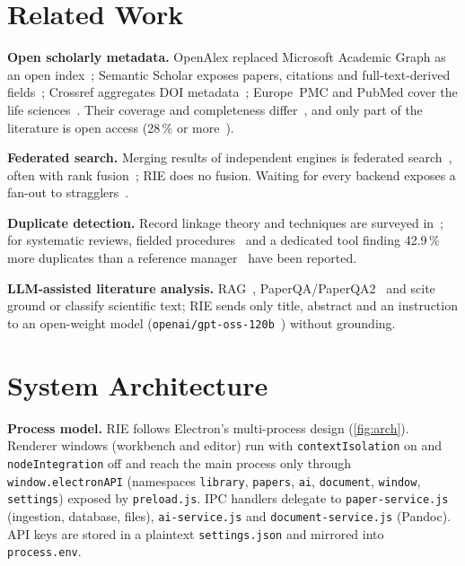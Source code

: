 \documentclass[conference]{IEEEtran}
\newcommand{\code}[1]{\texttt{\small #1}}
\newcommand{\RIE}{RIE}
\begin{document}
\section{Related Work}
\label{sec:related}

\textbf{Open scholarly metadata.} OpenAlex replaced Microsoft Academic Graph as an open index~\cite{priem2022openalex}; Semantic Scholar exposes papers, citations and full-text-derived fields~\cite{lo2020s2orc,kinney2023semantic}; Crossref aggregates DOI metadata~\cite{hendricks2020crossref}; Europe~PMC and PubMed cover the life sciences~\cite{ferguson2021europepmc,sayers2022eutilities}. Their coverage and completeness differ~\cite{visser2021large,alperin2024analysis,gusenbauer2020which}, and only part of the literature is open access (28\,\% or more~\cite{piwowar2018state}).

\textbf{Federated search.} Merging results of independent engines is federated search~\cite{shokouhi2011federated}, often with rank fusion~\cite{cormack2009reciprocal}; \RIE{} does no fusion. Waiting for every backend exposes a fan-out to stragglers~\cite{dean2013tail}.

\textbf{Duplicate detection.} Record linkage theory and techniques are surveyed in~\cite{fellegi1969theory,elmagarmid2007duplicate,christen2012data}; for systematic reviews, fielded procedures~\cite{bramer2016dedup} and a dedicated tool finding 42.9\,\% more duplicates than a reference manager~\cite{rathbone2015better} have been reported.

\textbf{LLM-assisted literature analysis.} RAG~\cite{lewis2020retrieval,gao2023retrieval}, PaperQA/PaperQA2~\cite{lala2023paperqa,skarlinski2024language} and scite~\cite{nicholson2021scite} ground or classify scientific text; \RIE{} sends only title, abstract and an instruction to an open-weight model (\code{openai/gpt-oss-120b}~\cite{openai2025gptoss}) without grounding.

\section{System Architecture}
\label{sec:arch}

\textbf{Process model.} \RIE{} follows Electron's multi-process design (\cref{fig:arch}). Renderer windows (workbench and editor) run with \code{contextIsolation} on and \code{nodeIntegration} off and reach the main process only through \code{window.electronAPI} (namespaces \code{library}, \code{papers}, \code{ai}, \code{document}, \code{window}, \code{settings}) exposed by \code{preload.js}. IPC handlers delegate to \code{paper-service.js} (ingestion, database, files), \code{ai-service.js} and \code{document-service.js} (Pandoc). API keys are stored in a plaintext \code{settings.json} and mirrored into \code{process.env}.
\end{document}
